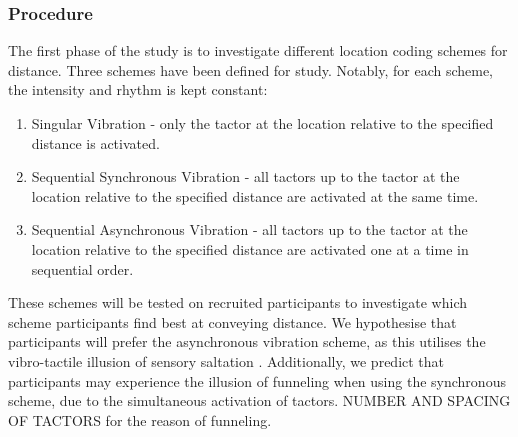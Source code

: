\documentclass{interim}
\begin{document}
\subsubsection{Procedure}\label{sec:lab-procedure}
The first phase of the study is to investigate different location coding schemes for distance. Three schemes have been defined for study. Notably, for each scheme, the intensity and rhythm is kept constant:
\begin{enumerate}
    \item Singular Vibration - only the tactor at the location relative to the specified distance is activated.
    \item Sequential Synchronous Vibration - all tactors up to the tactor at the location relative to the specified distance are activated at the same time.
    \item Sequential Asynchronous Vibration - all tactors up to the tactor at the location relative to the specified distance are activated one at a time in sequential order.
\end{enumerate}
These schemes will be tested on recruited participants to investigate which scheme participants find best at conveying distance. We hypothesise that participants will prefer the asynchronous vibration scheme, as this utilises the vibro-tactile illusion of sensory saltation \cite{5710913}. Additionally, we predict that participants may experience the illusion of funneling when using the synchronous scheme, due to the simultaneous activation of tactors. NUMBER AND SPACING OF TACTORS for the reason of funneling.
\end{document}
